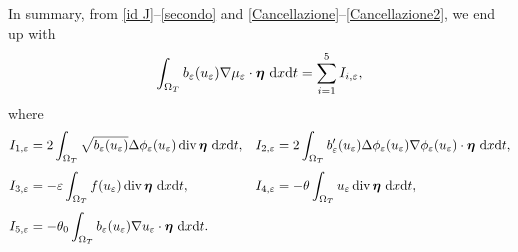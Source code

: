 \documentclass[11pt,  reqno]{amsart}%
\theoremstyle{plain}
\theoremstyle{definition}
\theoremstyle{remark}
\numberwithin{equation}{section}
\newcommand{\ve}{\varepsilon}
\def\div{\,\mathrm{div}}
\newcommand{\dx}{\textup{d}x}
\newcommand{\dt}{\textup{d}t}
\begin{document}
In summary, from \eqref{id J}--\eqref{secondo} and \eqref{Cancellazione}--\eqref{Cancellazione2}, we end up with
    \begin{equation}
        \label{limitequi}
        \int_{\Omega_T} b_{\ve}(u_{\ve})\nabla \mu_{\ve} \cdot \boldsymbol{\eta} \  \dx \dt= \sum_{i=1}^{5} I_{i, \ve},
    \end{equation}
    where
        \begin{align*}
       I_{1, \ve}&=2\int_{\Omega_T} \sqrt{b_\ve(u_\ve)}\Delta \phi_\ve(u_\ve) \div \, \boldsymbol{\eta}\ \dx \dt,&
       I_{2, \ve}&= 2 \int_{\Omega_T} b'_\ve(u_\ve) \Delta \phi_\ve(u_\ve)\nabla \phi_\ve(u_\ve)\cdot \boldsymbol{\eta} \ \dx \dt ,
       \\[3pt]
       I_{3, \ve}& = -\varepsilon  \int_{\Omega_T}  f(u_\ve)\div \,   \boldsymbol{\eta}  \ \dx \dt , &       
       I_{4,\ve}&= - \theta \int_{\Omega_T} u_\ve \div \,  \boldsymbol{\eta}  \ \dx \dt,
        \\[3pt]
        I_{5, \ve}&=- \theta_0 \int_{\Omega_T} b_\ve(u_\ve) \nabla u_\ve \cdot  \boldsymbol{\eta} \ \dx \dt.
    \end{align*}
\end{document}
